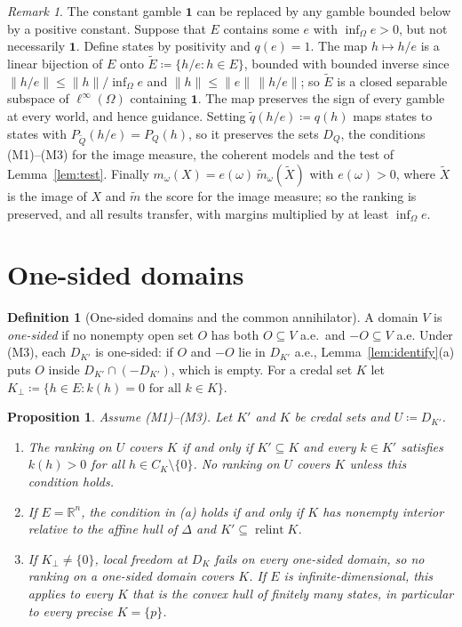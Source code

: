 \documentclass[11pt]{article}
\newcommand{\R}{\mathbb{R}}
\newcommand{\one}{\mathbf{1}}
\DeclareMathOperator{\relint}{relint}
\theoremstyle{plain}
\newtheorem{proposition}[theorem]{Proposition}
\theoremstyle{definition}
\newtheorem{definition}[theorem]{Definition}
\theoremstyle{remark}
\newtheorem{remark}[theorem]{Remark}
\begin{document}
\begin{remark}\label{rem:orderunit}
The constant gamble $\one$ can be replaced by any gamble bounded below by a positive constant.
Suppose that $E$ contains some $e$ with $\inf_\Omega e>0$, but not
necessarily $\one$. Define states by positivity and $q(e)=1$. The map $h\mapsto h/e$ is a
linear bijection of $E$ onto $\tilde E\coloneqq\{h/e:h\in E\}$, bounded with bounded inverse
since $\|h/e\|\le\|h\|/\inf_\Omega e$ and $\|h\|\le\|e\|\,\|h/e\|$; so $\tilde E$ is a closed
separable subspace of $\ell^\infty(\Omega)$ containing $\one$. The map preserves the sign of
every gamble at every world, and hence guidance. Setting $\tilde q(h/e)\coloneqq q(h)$ maps
states to states with $P_{\tilde Q}(h/e)=P_Q(h)$, so it preserves the sets $D_Q$, the
conditions (M1)--(M3) for the image measure, the coherent models and the test of
Lemma~\ref{lem:test}. Finally $m_\omega(X)=e(\omega)\,\tilde m_\omega(\tilde X)$ with
$e(\omega)>0$, where $\tilde X$ is the image of $X$ and $\tilde m$ the score for the image
measure; so the ranking is preserved, and all results transfer, with margins multiplied by at
least $\inf_\Omega e$.
\end{remark}

\section{One-sided domains}\label{app:onesided}

\begin{definition}[One-sided domains and the common annihilator]\label{def:one-sided}
A domain $V$ is \emph{one-sided} if no nonempty open set $O$ has both $O\subseteq V$ a.e.\ and
$-O\subseteq V$ a.e. Under (M3), each $D_{K'}$ is one-sided: if $O$ and $-O$ lie in $D_{K'}$
a.e., Lemma~\ref{lem:identify}(a) puts $O$ inside $D_{K'}\cap(-D_{K'})$, which is empty. For a
credal set $K$ let $K_\perp\coloneqq\{h\in E:k(h)=0\text{ for all }k\in K\}$.
\end{definition}

\begin{proposition}\label{prop:onesided}
Assume (M1)--(M3). Let $K'$ and $K$ be credal sets and $U\coloneqq D_{K'}$.
\begin{enumerate}[label=(\alph*)]
  \item The ranking on $U$ covers $K$ if and only if $K'\subseteq K$ and every $k\in K'$
  satisfies $k(h)>0$ for all $h\in C_K\setminus\{0\}$. No ranking on $U$ covers $K$ unless
  this condition holds.
  \item If $E=\R^n$, the condition in (a) holds if and only if $K$ has nonempty interior
  relative to the affine hull of $\Delta$ and $K'\subseteq\relint K$.
  \item If $K_\perp\ne\{0\}$, local freedom at $D_K$ fails on every one-sided domain, so no
  ranking on a one-sided domain covers $K$. If $E$ is infinite-dimensional, this applies to
  every $K$ that is the convex hull of finitely many states, in particular to every precise
  $K=\{p\}$.
\end{enumerate}
\end{proposition}
\end{document}
